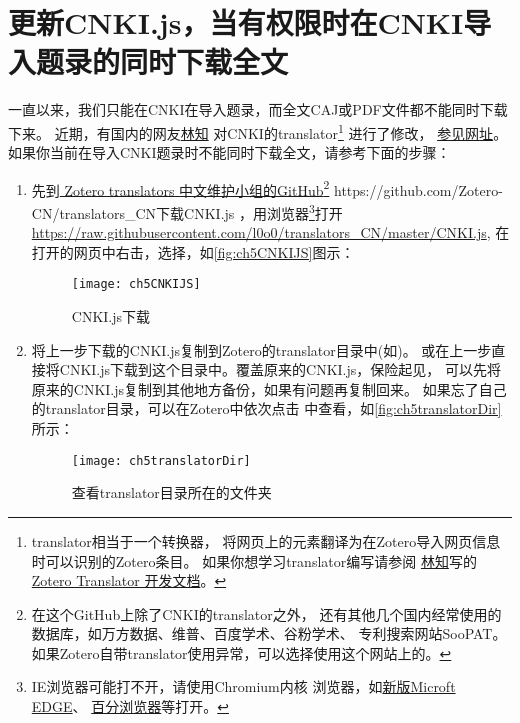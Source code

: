 \documentclass[theorem=false,mathfont=none,openany,sub3section]{easybook}
\begin{document}
{\section{更新CNKI.js，当有权限时在CNKI导入题录的同时下载全文}\label{sec:cnki_fulltext}

一直以来，我们只能在CNKI在导入题录，而全文CAJ或PDF文件都不能同时下载下来。
近期，有国内的网友\href{https://www.zhihu.com/people/lin-zhi-70}{林知}
对CNKI的translator\footnote{translator相当于一个转换器，
	将网页上的元素翻译为在Zotero导入网页信息时可以识别的Zotero条目。
	如果你想学习translator编写请参阅
	\href{https://www.zhihu.com/people/lin-zhi-70}{林知}写的
	\href{https://zhuanlan.zhihu.com/p/349871853}{Zotero Translator 开发文档}。}
进行了修改，
\href{https://www.linxingzhong.top/posts/2019-11-5/?tdsourcetag=s_pctim_aiomsg}{参见网址}。
如果你当前在导入CNKI题录时不能同时下载全文，请参考下面的步骤：
\begin{enumerate}
	\item\label{it:cnkijs}
	先到\href{https://github.com/Zotero-CN/translators_CN}{ Zotero translators 
		中文维护小组的GitHub\footnote{在这个GitHub上除了CNKI的translator之外，
			还有其他几个国内经常使用的数据库，如万方数据、维普、百度学术、谷粉学术、
			专利搜索网站SooPAT。如果Zotero自带translator使用异常，可以选择使用这个网站上的。} 
		\url{ https://github.com/Zotero-CN/translators_CN}}下载CNKI.js
	，用浏览器\footnote{IE浏览器可能打不开，请使用Chromium内核
		浏览器，如\href{https://www.microsoft.com/zh-cn/edge}{新版Microft EDGE}、
		\href{http://www.centbrowser.cn/history.html}{百分浏览器}等打开。}打开
	\url{https://raw.githubusercontent.com/l0o0/translators_CN/master/CNKI.js},
	在打开的网页中右击，选择，如\autoref{fig:ch5CNKIJS}图示：
	\begin{figure}[htbp]
		\centering
		\texttt{[image: ch5CNKIJS]}
		\caption{CNKI.js下载}
		\label{fig:ch5CNKIJS}
	\end{figure}
	\item
	将上一步下载的CNKI.js复制到Zotero的translator目录中(如)。
	或在上一步直接将CNKI.js下载到这个目录中。覆盖原来的CNKI.js，保险起见，
	可以先将原来的CNKI.js复制到其他地方备份，如果有问题再复制回来。
	如果忘了自己的translator目录，可以在Zotero中依次点击
	中查看，如\autoref{fig:ch5translatorDir}所示：
	\begin{figure}[htbp]
		\centering
		\texttt{[image: ch5translatorDir]}
		\caption{查看translator目录所在的文件夹}
		\label{fig:ch5translatorDir}

\end{figure}
\end{enumerate}}
\end{document}
